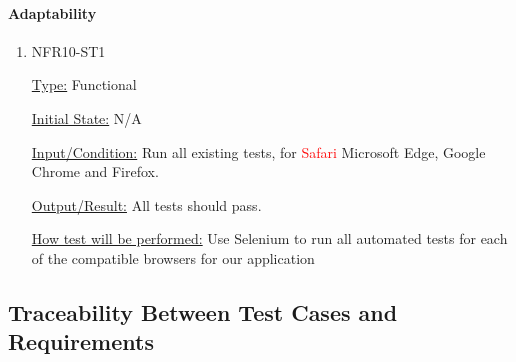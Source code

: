 \documentclass[12pt, titlepage]{article}
\begin{document}
\paragraph{Adaptability}

\begin{enumerate}

\item{NFR10-ST1\\}

\underline{Type:} Functional

\underline{Initial State:} N/A

\underline{Input/Condition:} Run all existing tests, for \textcolor{red} {Safari} Microsoft Edge, Google Chrome and Firefox. 

\underline{Output/Result:} All tests should pass.

\underline{How test will be performed:} 
Use Selenium to run all automated tests for each of the compatible browsers for our application

\end{enumerate}

\subsection{Traceability Between Test Cases and Requirements}
\end{document}
